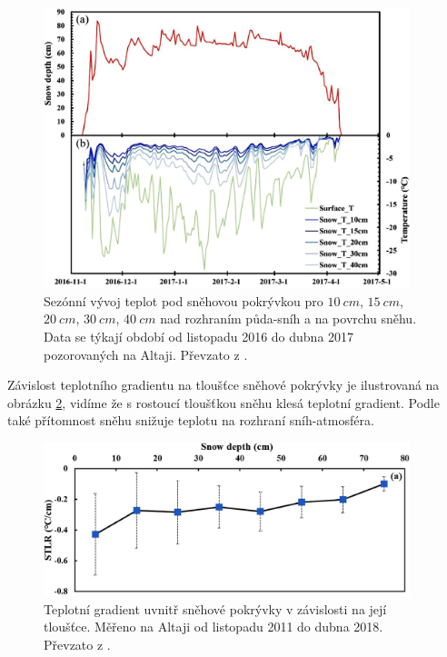 \begin{figure}
	\centering
	\includegraphics[width=0.95\textwidth]{img/ch1/snowtempaltai.png}
	\caption{Sezónní vývoj teplot pod sněhovou pokrývkou pro $\SI{10}{cm}$, $\SI{15}{cm}$, $\SI{20}{cm}$, $\SI{30}{cm}$, $\SI{40}{cm}$ nad rozhraním půda-sníh a na povrchu sněhu. Data se týkají období od listopadu 2016 do dubna 2017 pozorovaných na Altaji. Převzato z \parencite{zhangwei2021}.}
	\label{fig:snowtempaltai}
\end{figure}

Závislost teplotního gradientu na tloušťce sněhové pokrývky je ilustrovaná na obrázku \ref{fig:snowlapserate}, vidíme že s rostoucí tloušťkou sněhu klesá teplotní gradient. Podle \parencite{zhangwei2021} také přítomnost sněhu snižuje teplotu na rozhraní sníh-atmosféra.

\begin{figure}
	\centering
	\includegraphics[width=0.95\textwidth]{img/ch1/snowlapserate.png}
	\caption{Teplotní gradient uvnitř sněhové pokrývky v závislosti na její tloušťce. Měřeno na Altaji od listopadu 2011 do dubna 2018. Převzato z \parencite{zhangwei2021}.}
	\label{fig:snowlapserate}
\end{figure}


